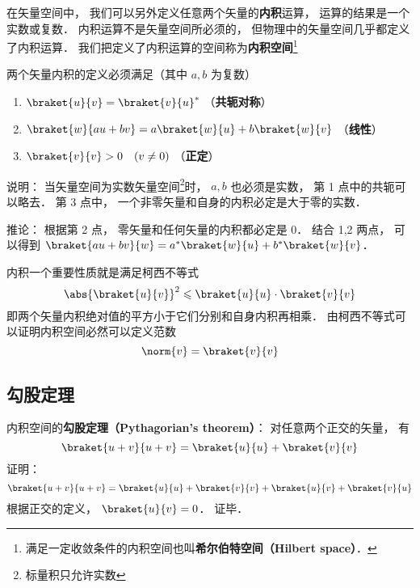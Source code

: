 

在矢量空间中， 我们可以另外定义任意两个矢量的\textbf{内积}运算， 运算的结果是一个实数或复数． 内积运算不是矢量空间所必须的， 但物理中的矢量空间几乎都定义了内积运算． 我们把定义了内积运算的空间称为\textbf{内积空间}\footnote{满足一定收敛条件的内积空间也叫\textbf{希尔伯特空间（Hilbert space）}．}

两个矢量内积的定义必须满足（其中 $a, b$ 为复数）
\begin{enumerate}
\item $\braket{u}{v} = \braket{v}{u}^*$ （\textbf{共轭对称}）
\item $\braket{w}{a u + b v} = a\braket{w}{u} + b\braket{w}{v}$ （\textbf{线性}）
\item $\braket{v}{v} > 0 \quad (v \ne 0)$  （\textbf{正定}）
\end{enumerate}

说明： 当矢量空间为实数矢量空间\footnote{标量积只允许实数}时， $a, b$ 也必须是实数， 第 1 点中的共轭可以略去． 第 3 点中， 一个非零矢量和自身的内积必定是大于零的实数．

推论： 根据第 2 点， 零矢量和任何矢量的内积都必定是 0． 结合 1,2 两点， 可以得到 $\braket{a u + b v}{w} = a^*\braket{w}{u} + b^*\braket{w}{v}$．

内积一个重要性质就是满足柯西不等式
\begin{equation}
\abs{\braket{u}{v}}^2 \leqslant \braket{u}{u} \cdot \braket{v}{v}
\end{equation}
即两个矢量内积绝对值的平方小于它们分别和自身内积再相乘． 由柯西不等式可以证明内积空间必然可以定义范数
\begin{equation}
\norm{v} = \braket{v}{v}
\end{equation}

\subsection{勾股定理}
内积空间的\textbf{勾股定理（Pythagorian's theorem）}： 对任意两个正交的矢量， 有
\begin{equation}
\braket{u + v}{u + v} = \braket{u}{u} + \braket{v}{v}
\end{equation}
证明：
\begin{equation}
\braket{u + v}{u + v} = \braket{u}{u} + \braket{v}{v} + \braket{u}{v} + \braket{v}{u}
\end{equation}
根据正交的定义， $\braket{u}{v} = 0$． 证毕．

